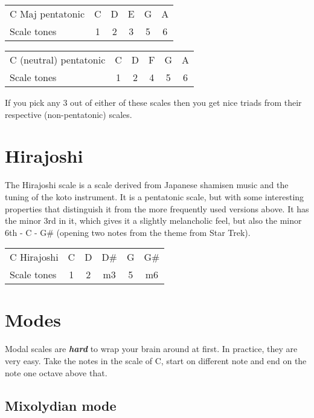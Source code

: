 \documentclass[
  12pt,
  letterpaper,
  oneside,
  open=any]{scrbook}
\begin{document}
\begin{longtable}[]{@{}lccccc@{}}
\toprule\noalign{}
\endhead
\bottomrule\noalign{}
\endlastfoot
C Maj pentatonic & C & D & E & G & A \\
Scale tones & 1 & 2 & 3 & 5 & 6 \\
\end{longtable}

\begin{longtable}[]{@{}lccccc@{}}
\toprule\noalign{}
\endhead
\bottomrule\noalign{}
\endlastfoot
C (neutral) pentatonic & C & D & F & G & A \\
Scale tones & 1 & 2 & 4 & 5 & 6 \\
\end{longtable}

If you pick any 3 out of either of these scales then you get nice triads
from their respective (non-pentatonic) scales.

\section{Hirajoshi}\label{hirajoshi}

The Hirajoshi scale is a scale derived from Japanese shamisen music and
the tuning of the koto instrument. It is a pentatonic scale, but with
some interesting properties that distinguish it from the more frequently
used versions above. It has the minor 3rd in it, which gives it a
slightly melancholic feel, but also the minor 6th - C - G\# (opening two
notes from the theme from Star Trek).

\begin{longtable}[]{@{}lccccc@{}}
\toprule\noalign{}
\endhead
\bottomrule\noalign{}
\endlastfoot
C Hirajoshi & C & D & D\# & G & G\# \\
Scale tones & 1 & 2 & m3 & 5 & m6 \\
\end{longtable}

\section{Modes}\label{modes}

Modal scales are \textbf{\emph{hard}} to wrap your brain around at
first. In practice, they are very easy. Take the notes in the scale of
C, start on different note and end on the note one octave above that.

\subsection{Mixolydian mode}\label{mixolydian-mode}
\end{document}
